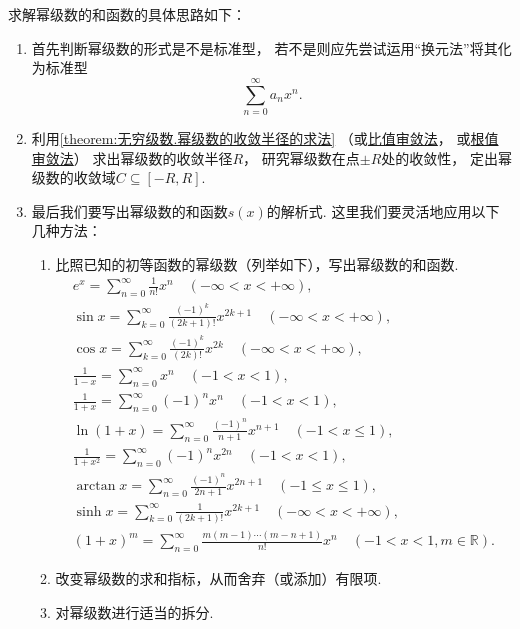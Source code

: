 求解幂级数的和函数的具体思路如下：
\begin{enumerate}
\item 首先判断幂级数的形式是不是标准型，%
若不是则应先尝试运用“换元法”将其化为标准型\[
\sum\limits_{n=0}^\infty a_n x^n.
\]

\item 利用\cref{theorem:无穷级数.幂级数的收敛半径的求法}%
（或\hyperref[theorem:无穷级数.正项级数的比值审敛法]{比值审敛法}，%
或\hyperref[theorem:无穷级数.正项级数的根值审敛法]{根值审敛法}）%
求出幂级数的收敛半径\(R\)，%
研究幂级数在点\(\pm R\)处的收敛性，%
定出幂级数的收敛域\(C\subseteq[-R,R]\).

\item 最后我们要写出幂级数的和函数\(s(x)\)的解析式.
这里我们要灵活地应用以下几种方法：
\begin{enumerate}
	\item 比照已知的初等函数的幂级数（列举如下），写出幂级数的和函数.
	\begin{gather*}
	e^x = \sum\limits_{n=0}^\infty \frac{1}{n!} x^n
		\quad(-\infty<x<+\infty), \\
	\sin x = \sum\limits_{k=0}^\infty \frac{(-1)^k}{(2k+1)!} x^{2k+1}
		\quad(-\infty<x<+\infty), \\
	\cos x = \sum\limits_{k=0}^\infty \frac{(-1)^k}{(2k)!} x^{2k}
		\quad(-\infty<x<+\infty), \\
	\frac{1}{1-x} = \sum\limits_{n=0}^\infty x^n
		\quad(-1<x<1), \\
	\frac{1}{1+x} = \sum\limits_{n=0}^\infty (-1)^n x^n
		\quad(-1<x<1), \\
	\ln(1+x) = \sum\limits_{n=0}^\infty \frac{(-1)^n}{n+1} x^{n+1}
		\quad(-1<x\leqslant1), \\
	\frac{1}{1+x^2} = \sum\limits_{n=0}^\infty (-1)^n x^{2n}
		\quad(-1<x<1), \\
	\arctan x = \sum\limits_{n=0}^\infty \frac{(-1)^n}{2n+1} x^{2n+1}
		\quad(-1 \leqslant x \leqslant 1), \\
	\sinh x = \sum\limits_{k=0}^\infty \frac{1}{(2k+1)!} x^{2k+1}
		\quad(-\infty<x<+\infty), \\
	(1+x)^m = \sum\limits_{n=0}^\infty \frac{m(m-1)\dotsm(m-n+1)}{n!} x^n
		\quad(-1<x<1,m\in\mathbb{R}).
	\end{gather*}

	\item 改变幂级数的求和指标，从而舍弃（或添加）有限项.

	\item 对幂级数进行适当的拆分.


\end{enumerate}
\end{enumerate}
